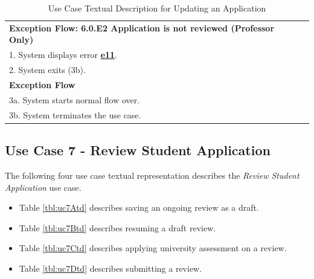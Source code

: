 \documentclass[fontsize=12pt,paper=letter,twoside]{scrartcl}
\begin{document}
\begin{table}[!htb]
\begin{center}
\begin{tabular}{|l|l|}
\textbf{Exception Flow: 6.0.E2 Application is not reviewed (Professor Only)}
\\ 1. System displays error \hyperref[app:error]{\textbf{e11}}.
\\ 2. System exits (3b). \\ \hline
\textbf{Exception Flow}
\\ 3a. System starts normal flow over.
\\ 3b. System terminates the use case.\\ \hline 
\end{tabular}
\end{center}
\caption {Use Case Textual Description for Updating an Application}
\label{tbl:uc6td}
\end{table}

\clearpage
\newpage
\subsection{Use Case 7 - Review Student Application} \label{subsec:uc7}

The following four use case textual representation describes the \emph{Review Student Application} use case.

\begin{itemize}
\item Table \ref{tbl:uc7Atd} describes saving an ongoing review as a draft.
\item Table \ref{tbl:uc7Btd} describes resuming a draft review.
\item Table \ref{tbl:uc7Ctd} describes applying university assessment on a review.
\item Table \ref{tbl:uc7Dtd} describes submitting a review.
\end{itemize} 
\end{document}
